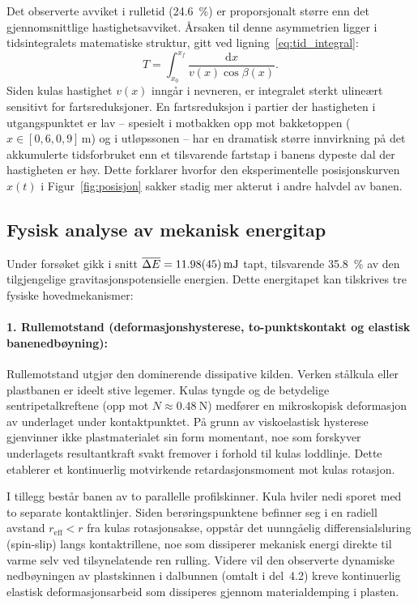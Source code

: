 \documentclass[11pt,a4paper]{article}
\begin{document}
Det observerte avviket i rulletid (\SI{24,6}{\percent}) er proporsjonalt større enn det gjennomsnittlige hastighetsavviket. Årsaken til denne asymmetrien ligger i tidsintegralets matematiske struktur, gitt ved ligning~\eqref{eq:tid_integral}:
\begin{equation*}
    T = \int_{x_0}^{x_f} \frac{\mathrm{d}x}{v(x)\cos\beta(x)}.
\end{equation*}
Siden kulas hastighet $v(x)$ inngår i nevneren, er integralet sterkt ulineært sensitivt for fartsreduksjoner. En fartsreduksjon i partier der hastigheten i utgangspunktet er lav -- spesielt i motbakken opp mot bakketoppen ($x \in [0{,}6, 0{,}9]\,\si{\meter}$) og i utløpssonen -- har en dramatisk større innvirkning på det akkumulerte tidsforbruket enn et tilsvarende fartstap i banens dypeste dal der hastigheten er høy. Dette forklarer hvorfor den eksperimentelle posisjonskurven $x(t)$ i Figur~\ref{fig:posisjon} sakker stadig mer akterut i andre halvdel av banen.

\subsection{Fysisk analyse av mekanisk energitap}
Under forsøket gikk i snitt $\overline{\Delta E} = \SI{11,98 \pm 0,45}{\milli\joule}$ tapt, tilsvarende \SI{35,8}{\percent} av den tilgjengelige gravitasjonspotensielle energien. Dette energitapet kan tilskrives tre fysiske hovedmekanismer:

\paragraph{1. Rullemotstand (deformasjonshysterese, to-punktskontakt og elastisk banenedbøyning):}
Rullemotstand utgjør den dominerende dissipative kilden. Verken stålkula eller plastbanen er ideelt stive legemer. Kulas tyngde og de betydelige sentripetalkreftene (opp mot $N \approx \SI{0,48}{\newton}$) medfører en mikroskopisk deformasjon av underlaget under kontaktpunktet. På grunn av viskoelastisk hysterese gjenvinner ikke plastmaterialet sin form momentant, noe som forskyver underlagets resultantkraft svakt fremover i forhold til kulas loddlinje. Dette etablerer et kontinuerlig motvirkende retardasjonsmoment mot kulas rotasjon.

I tillegg består banen av to parallelle profilskinner. Kula hviler nedi sporet med to separate kontaktlinjer. Siden berøringspunktene befinner seg i en radiell avstand $r_{\text{eff}} < r$ fra kulas rotasjonsakse, oppstår det uunngåelig differensialsluring (spin-slip) langs kontaktrillene, noe som dissiperer mekanisk energi direkte til varme selv ved tilsynelatende ren rulling. Videre vil den observerte dynamiske nedbøyningen av plastskinnen i dalbunnen (omtalt i del~4.2) kreve kontinuerlig elastisk deformasjonsarbeid som dissiperes gjennom materialdemping i plasten.
\end{document}
